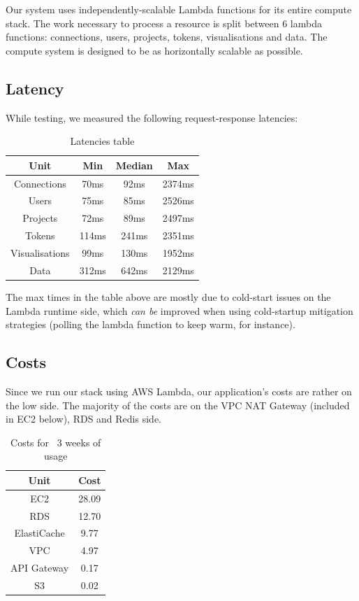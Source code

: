 \documentclass{article}
\begin{document}
\hspace{1cm} Our system uses independently-scalable Lambda functions for its entire compute stack.
The work necessary to process a resource is split between 6 lambda functions: connections, users, projects, tokens, visualisations and data.
The compute system is designed to be as horizontally scalable as possible.

\subsection{Latency}

\hspace{1cm} While testing, we measured the following request-response latencies:

\begin{table}[htbp]
    \centering
    \begin{tabular}{c|c c c}
        Unit & Min & Median & Max \\
        \hline
        Connections & 70ms & 92ms & 2374ms \\
        Users & 75ms & 85ms & 2526ms \\
        Projects & 72ms & 89ms & 2497ms \\
        Tokens & 114ms & 241ms & 2351ms \\
        Visualisations & 99ms & 130ms & 1952ms \\
        Data & 312ms & 642ms & 2129ms
    \end{tabular} 
    \caption{Latencies table}
\end{table}

The max times in the table above are mostly due to cold-start issues on the Lambda runtime side, which \textit{can be}
improved when using cold-startup mitigation strategies (polling the lambda function to keep warm, for instance).

\subsection{Costs}

\hspace{1cm}Since we run our stack using AWS Lambda, our application's costs are rather on the low side. The majority of
the costs are on the VPC NAT Gateway (included in EC2 below), RDS and Redis side.

\begin{table}[htbp]
    \centering
    \begin{tabular}{c|c}
        Unit & Cost \\
        \hline
        EC2 & 28.09 \\
        RDS & 12.70 \\
        ElastiCache & 9.77 \\
        VPC & 4.97 \\
        API Gateway & 0.17 \\
        S3 & 0.02
    \end{tabular} 
    \caption{Costs for ~3 weeks of usage}
\end{table}
\end{document}
